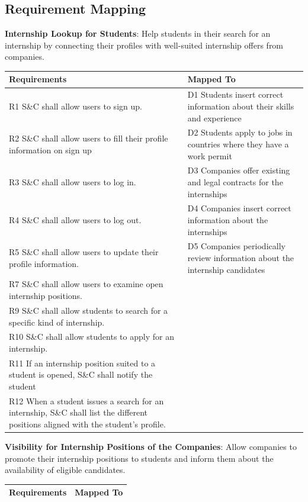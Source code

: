 \newpage

\subsection{Requirement Mapping}

\begin{enumerate}[label={[G\arabic*]}]
\item \textbf{Internship Lookup for Students}: 
                Help students in their search for an internship by connecting their profiles with well-suited internship offers from companies.

\begin{longtable}{|p{8cm}|p{8cm}|}
\hline
\rowcolor[HTML]{CFE2F3} 
\textbf{Requirements} & \textbf{Mapped To} \\
\hline
\endfirsthead

\hline
\endfoot

\hline
\endlastfoot
R1 S\&C shall allow users to sign up. & D1 Students insert correct information about their skills and experience \\
R2 S\&C shall allow users to fill their profile information on sign up & D2 Students apply to jobs in countries where they have a work permit \\
R3 S\&C shall allow users to log in. & D3 Companies offer existing and legal contracts for the internships \\
R4 S\&C shall allow users to log out. & D4 Companies insert correct information about the internships \\
R5 S\&C shall allow users to update their profile information. & D5 Companies periodically review information about the internship candidates \\
R7 S\&C shall allow users to examine open internship positions.  & \\
R9 S\&C shall allow students to search for a specific kind of internship.  & \\ 
R10 S\&C shall allow students to apply for an internship.     & \\
R11 If an internship position suited to a student is opened, S\&C shall notify the student & \\
R12 When a student issues a search for an internship, S\&C shall list the different positions aligned with the student's profile.  & \\

\end{longtable}


\newpage
\item \textbf{Visibility for Internship Positions of the Companies}: 
                Allow companies to promote their internship positions to students and inform them about the availability of eligible candidates.
\begin{longtable}{|p{8cm}|p{8cm}|}
\hline
\rowcolor[HTML]{CFE2F3} 
\textbf{Requirements} & \textbf{Mapped To} \\
\hline
\endfirsthead


\end{longtable}
\end{enumerate}
